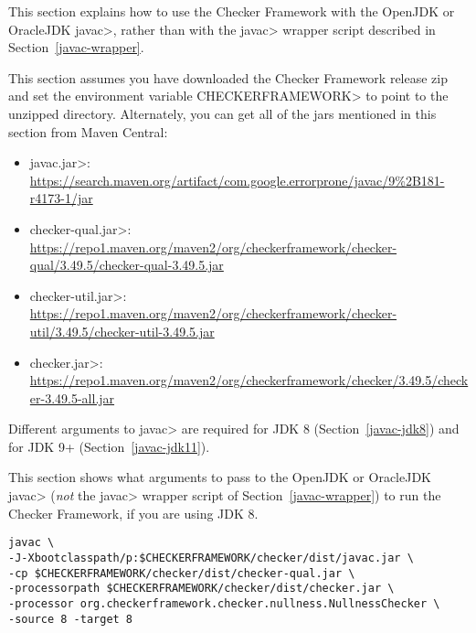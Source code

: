 
This section explains how to use the Checker Framework with the OpenJDK or
OracleJDK \<javac>, rather than with the \<javac> wrapper script described in
Section~\ref{javac-wrapper}.

This
section assumes you have downloaded the Checker Framework release zip and set
the environment variable \<CHECKERFRAMEWORK> to point to the unzipped directory.
Alternately, you can get all of the jars mentioned in this section from Maven Central:

\begin{itemize}
\item \<javac.jar>: \url{https://search.maven.org/artifact/com.google.errorprone/javac/9%2B181-r4173-1/jar}
\item \<checker-qual.jar>: \url{https://repo1.maven.org/maven2/org/checkerframework/checker-qual/3.49.5/checker-qual-3.49.5.jar}
\item \<checker-util.jar>: \url{https://repo1.maven.org/maven2/org/checkerframework/checker-util/3.49.5/checker-util-3.49.5.jar}
\item \<checker.jar>: \url{https://repo1.maven.org/maven2/org/checkerframework/checker/3.49.5/checker-3.49.5-all.jar}
\end{itemize}

Different arguments to \<javac> are required for JDK 8
(Section~\ref{javac-jdk8}) and for JDK 9+ (Section~\ref{javac-jdk11}).



This section shows what arguments to pass to the OpenJDK or OracleJDK
\<javac> (\emph{not} the \<javac> wrapper script of
Section~\ref{javac-wrapper}) to run the Checker
Framework, if you are using JDK 8.

\begin{Verbatim}
javac \
-J-Xbootclasspath/p:$CHECKERFRAMEWORK/checker/dist/javac.jar \
-cp $CHECKERFRAMEWORK/checker/dist/checker-qual.jar \
-processorpath $CHECKERFRAMEWORK/checker/dist/checker.jar \
-processor org.checkerframework.checker.nullness.NullnessChecker \
-source 8 -target 8
\end{Verbatim}

